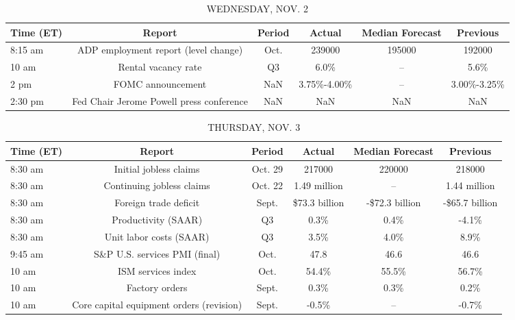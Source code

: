 \documentclass{article}%
\begin{document}
\begin{table}[htbp]%
\caption{WEDNESDAY, NOV. 2}%
\centering%
\begin{adjustbox}{width=1\textwidth}%
\begin{tabular}{lccccc}
\toprule
Time (ET) &                                   Report & Period &      Actual & Median Forecast &    Previous \\
\midrule
  8:15 am &     ADP employment report (level change) &   Oct. &      239000 &          195000 &      192000 \\
    10 am &                      Rental vacancy rate &     Q3 &        6.0\% &              -- &        5.6\% \\
     2 pm &                        FOMC announcement &    NaN & 3.75\%-4.00\% &              -- & 3.00\%-3.25\% \\
  2:30 pm & Fed Chair Jerome Powell press conference &    NaN &         NaN &             NaN &         NaN \\
\bottomrule
\end{tabular}
%
\end{adjustbox}%
\end{table}

%


\begin{table}[htbp]%
\caption{THURSDAY, NOV. 3}%
\centering%
\begin{adjustbox}{width=1\textwidth}%
\begin{tabular}{lccccc}
\toprule
Time (ET) &                                   Report &  Period &        Actual & Median Forecast &       Previous \\
\midrule
  8:30 am &                   Initial jobless claims & Oct. 29 &        217000 &          220000 &         218000 \\
  8:30 am &                Continuing jobless claims & Oct. 22 &  1.49 million &              -- &   1.44 million \\
  8:30 am &                    Foreign trade deficit &   Sept. & \$73.3 billion &  -\$72.3 billion & -\$65.7 billion \\
  8:30 am &                      Productivity (SAAR) &      Q3 &          0.3\% &            0.4\% &          -4.1\% \\
  8:30 am &                  Unit labor costs (SAAR) &      Q3 &          3.5\% &            4.0\% &           8.9\% \\
  9:45 am &            S\&P U.S. services PMI (final) &    Oct. &          47.8 &            46.6 &           46.6 \\
    10 am &                       ISM services index &    Oct. &         54.4\% &           55.5\% &          56.7\% \\
    10 am &                           Factory orders &   Sept. &          0.3\% &            0.3\% &           0.2\% \\
    10 am & Core capital equipment orders (revision) &   Sept. &         -0.5\% &              -- &          -0.7\% \\
\bottomrule
\end{tabular}
%
\end{adjustbox}%
\end{table}
\end{document}
